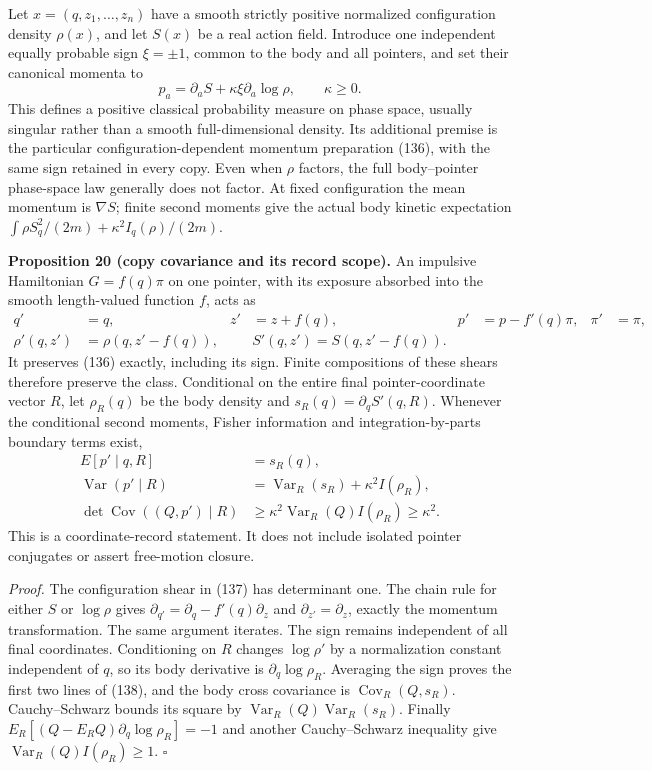 \documentclass[11pt,a4paper]{article}
\begin{document}
Let \(x=(q,z_1,\ldots,z_n)\) have a smooth strictly positive normalized
configuration density \(\rho(x)\), and let \(S(x)\) be a real action
field. Introduce one independent equally probable sign \(\xi=\pm1\),
common to the body and all pointers, and set their canonical momenta to
\[p_a=\partial_a S+\kappa\xi\partial_a\log\rho,
\qquad \kappa\ge0.\tag{136}\] This defines a positive classical
probability measure on phase space, usually singular rather than a
smooth full-dimensional density. Its additional premise is the
particular configuration-dependent momentum preparation (136), with the
same sign retained in every copy. Even when \(\rho\) factors, the full
body--pointer phase-space law generally does not factor. At fixed
configuration the mean momentum is \(\nabla S\); finite second moments
give the actual body kinetic expectation
\(\int\rho S_q^2/(2m)+\kappa^2 I_q(\rho)/(2m)\).

\textbf{Proposition 20 (copy covariance and its record scope).} An
impulsive Hamiltonian \(G=f(q)\pi\) on one pointer, with its exposure
absorbed into the smooth length-valued function \(f\), acts as
\[\begin{aligned}
q'&=q,&z'&=z+f(q),&p'&=p-f'(q)\pi,&\pi'&=\pi,\\
\rho'(q,z')&=\rho(q,z'-f(q)),&&
S'(q,z')=S(q,z'-f(q)).
\end{aligned}\tag{137}\] It preserves (136) exactly, including its sign.
Finite compositions of these shears therefore preserve the class.
Conditional on the entire final pointer-coordinate vector \(R\), let
\(\rho_R(q)\) be the body density and \(s_R(q)=\partial_q S'(q,R)\).
Whenever the conditional second moments, Fisher information and
integration-by-parts boundary terms exist, \[\begin{aligned}
E[p'\mid q,R]&=s_R(q),\\
\operatorname{Var}(p'\mid R)&=
 \operatorname{Var}_R(s_R)+\kappa^2 I(\rho_R),\\
\det\operatorname{Cov}((Q,p')\mid R)&\ge
 \kappa^2\operatorname{Var}_R(Q)I(\rho_R)\ge\kappa^2.
\end{aligned}\tag{138}\] This is a coordinate-record statement. It does
not include isolated pointer conjugates or assert free-motion closure.

\emph{Proof.} The configuration shear in (137) has determinant one. The
chain rule for either \(S\) or \(\log\rho\) gives
\(\partial_{q'}=\partial_q-f'(q)\partial_z\) and
\(\partial_{z'}=\partial_z\), exactly the momentum transformation. The
same argument iterates. The sign remains independent of all final
coordinates. Conditioning on \(R\) changes \(\log\rho'\) by a
normalization constant independent of \(q\), so its body derivative is
\(\partial_q\log\rho_R\). Averaging the sign proves the first two lines
of (138), and the body cross covariance is
\(\operatorname{Cov}_R(Q,s_R)\). Cauchy--Schwarz bounds its square by
\(\operatorname{Var}_R(Q)\operatorname{Var}_R(s_R)\). Finally
\(E_R[(Q-E_RQ)\partial_q\log\rho_R]=-1\) and another Cauchy--Schwarz
inequality give \(\operatorname{Var}_R(Q)I(\rho_R)\ge1\). \(\square\)
\end{document}
